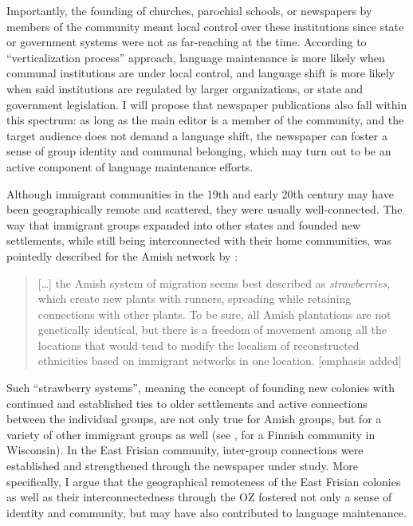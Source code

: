 \documentclass[output=paper]{langsci/langscibook}
\begin{document}
Importantly, the founding of churches, parochial schools, or newspapers by members of the community meant local control over these institutions since state or government systems were not as far-reaching at the time. According to  “verticalization process” approach, language maintenance is more likely when communal institutions are under local control, and language shift is more likely when said institutions are regulated by larger organizations, or state and government legislation. I will propose that newspaper publications also fall within this spectrum: as long as the main editor is a member of the community, and the target audience does not demand a language shift, the newspaper can foster a sense of group identity and communal belonging, which may turn out to be an active component of language maintenance efforts. 


Although immigrant communities in the 19th and early 20th century may have been geographically remote and scattered, they were usually well-connected. The way that immigrant groups expanded into other states and founded new settlements, while still being interconnected with their home communities, was pointedly described for the Amish network by \citet[183]{Reschly2000}:
 
\begin{quote}
 […] the Amish system of migration seems best described as \textit{strawberries}, which create new plants with runners, spreading while retaining connections with other plants. To be sure, all Amish plantations are not genetically identical, but there is a freedom of movement among all the locations that would tend to modify the localism of reconstructed ethnicities based on immigrant networks in one location. [emphasis added]
\end{quote}

Such “strawberry systems”, meaning the concept of founding new colonies with continued and established ties to older settlements and active connections between the individual groups, are not only true for Amish groups, but for a variety of other immigrant groups as well (see \citealt{Johnson2018}, for a Finnish community in Wisconsin). In the East Frisian community, inter-group connections were established and strengthened through the newspaper under study. More specifically, I argue that the geographical remoteness of the East Frisian colonies as well as their interconnectedness through the OZ fostered not only a sense of identity and community, but may have also contributed to language maintenance.
\end{document}
